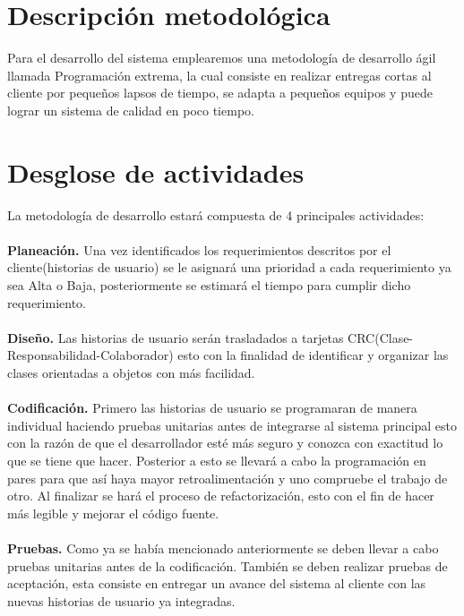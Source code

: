 
\section{Descripción metodológica}
Para el desarrollo del sistema emplearemos una metodología de desarrollo ágil llamada Programación extrema, la cual consiste en realizar entregas cortas al cliente por pequeños lapsos de tiempo, se adapta a pequeños equipos y puede lograr un sistema de calidad en poco tiempo.

\section{Desglose de actividades}

La metodología de desarrollo estará compuesta de 4 principales actividades:\\\\
\textbullet \textbf{Planeación.}
Una vez identificados los requerimientos descritos por el cliente(historias de usuario) se le asignará una prioridad a cada requerimiento ya sea Alta o Baja, posteriormente se estimará el tiempo para cumplir dicho requerimiento.\\\\
\textbullet \textbf{Diseño.}
Las historias de usuario serán trasladados a tarjetas CRC(Clase-Responsabilidad-Colaborador) esto con la finalidad de identificar y organizar las clases orientadas a objetos con más facilidad.\\\\
\textbullet \textbf{Codificación.}
Primero las historias de usuario se programaran de manera individual haciendo pruebas unitarias antes de integrarse al sistema principal esto con la razón de que el desarrollador esté más seguro y conozca con exactitud lo que se tiene que hacer. Posterior a esto se llevará a cabo la programación en pares para que así haya mayor retroalimentación y uno compruebe el trabajo de otro. Al finalizar se hará el proceso de refactorización, esto con el fin de hacer más legible y mejorar el código fuente.\\\\
\textbullet \textbf{Pruebas.}
Como ya se había mencionado anteriormente se deben llevar a cabo pruebas unitarias antes de la codificación. También se deben realizar pruebas de aceptación, esta consiste en entregar un avance del sistema al cliente con las nuevas historias de usuario  ya integradas.

